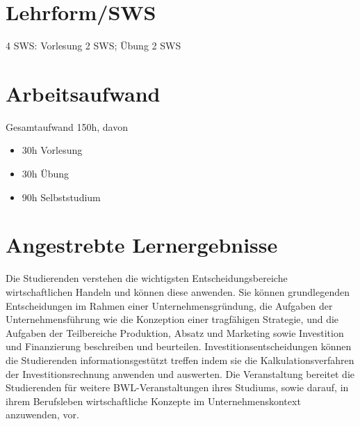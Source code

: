 \hypertarget{lehrformswspathlabelmi-2017modulbeschreibungen-bachelorba_bwl1}{%
\section*{Lehrform/SWS\label{/mi-2017/modulbeschreibungen-bachelor/BA_BWL1}}\label{lehrformswspathlabelmi-2017modulbeschreibungen-bachelorba_bwl1}}

4 SWS: Vorlesung 2 SWS; Übung 2 SWS

\hypertarget{arbeitsaufwandpathlabelmi-2017modulbeschreibungen-bachelorba_bwl1}{%
\section*{Arbeitsaufwand\label{/mi-2017/modulbeschreibungen-bachelor/BA_BWL1}}\label{arbeitsaufwandpathlabelmi-2017modulbeschreibungen-bachelorba_bwl1}}

Gesamtaufwand 150h, davon

\begin{itemize}
\tightlist
\item
  30h Vorlesung
\item
  30h Übung
\item
  90h Selbststudium
\end{itemize}

\hypertarget{angestrebte-lernergebnissepathlabelmi-2017modulbeschreibungen-bachelorba_bwl1}{%
\section*{Angestrebte
Lernergebnisse\label{/mi-2017/modulbeschreibungen-bachelor/BA_BWL1}}\label{angestrebte-lernergebnissepathlabelmi-2017modulbeschreibungen-bachelorba_bwl1}}

Die Studierenden verstehen die wichtigsten Entscheidungsbereiche
wirtschaftlichen Handeln und können diese anwenden. Sie können
grundlegenden Entscheidungen im Rahmen einer Unternehmensgründung, die
Aufgaben der Unternehmensführung wie die Konzeption einer tragfähigen
Strategie, und die Aufgaben der Teilbereiche Produktion, Absatz und
Marketing sowie Investition und Finanzierung beschreiben und beurteilen.
Investitionsentscheidungen können die Studierenden informationsgestützt
treffen indem sie die Kalkulationsverfahren der Investitionsrechnung
anwenden und auswerten. Die Veranstaltung bereitet die Studierenden für
weitere BWL-Veranstaltungen ihres Studiums, sowie darauf, in ihrem
Berufsleben wirtschaftliche Konzepte im Unternehmenskontext anzuwenden,
vor.

